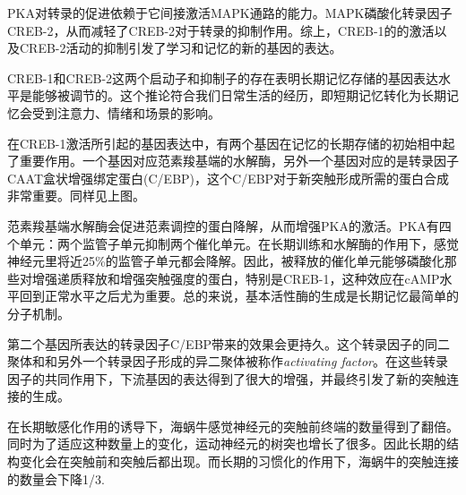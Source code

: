 \documentclass[UTF8,nofonts]{ctexart}
\begin{document}
PKA对转录的促进依赖于它间接激活MAPK通路的能力。MAPK磷酸化转录因子CREB-2，从而减轻了CREB-2对于转录的抑制作用。综上，CREB-1的的激活以及CREB-2活动的抑制引发了学习和记忆的新的基因的表达。
\par
CREB-1和CREB-2这两个启动子和抑制子的存在表明长期记忆存储的基因表达水平是能够被调节的。这个推论符合我们日常生活的经历，即短期记忆转化为长期记忆会受到注意力、情绪和场景的影响。
\par
在CREB-1激活所引起的基因表达中，有两个基因在记忆的长期存储的初始相中起了重要作用。一个基因对应范素羧基端的水解酶，另外一个基因对应的是转录因子CAAT盒状增强绑定蛋白(C/EBP)，这个C/EBP对于新突触形成所需的蛋白合成非常重要。同样见上图。
\par
范素羧基端水解酶会促进范素调控的蛋白降解，从而增强PKA的激活。PKA有四个单元：两个监管子单元抑制两个催化单元。在长期训练和水解酶的作用下，感觉神经元里将近25\%的监管子单元都会降解。因此，被释放的催化单元能够磷酸化那些对增强递质释放和增强突触强度的蛋白，特别是CREB-1，这种效应在cAMP水平回到正常水平之后尤为重要。总的来说，基本活性酶的生成是长期记忆最简单的分子机制。
\par
第二个基因所表达的转录因子C/EBP带来的效果会更持久。这个转录因子的同二聚体和和另外一个转录因子形成的异二聚体被称作\textit{activating factor}。在这些转录因子的共同作用下，下流基因的表达得到了很大的增强，并最终引发了新的突触连接的生成。
\par
在长期敏感化作用的诱导下，海蜗牛感觉神经元的突触前终端的数量得到了翻倍。同时为了适应这种数量上的变化，运动神经元的树突也增长了很多。因此长期的结构变化会在突触前和突触后都出现。而长期的习惯化的作用下，海蜗牛的突触连接的数量会下降1/3.
\end{document}
